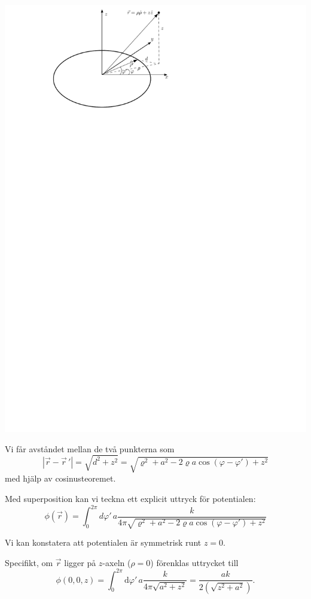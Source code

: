 \documentclass[%
oneside,                 %
final,                   %
10pt]{article}
\newenvironment{notice_mdfboxadmon}[1][]{
\begin{notice_mdfboxmdframed}[frametitle=#1]
}
{
\end{notice_mdfboxmdframed}
}
\begin{document}
\begin{notice_mdfboxadmon}
\centerline{\includegraphics[width=0.8\linewidth]{fig/ex6_cirkelkalla.pdf}}

\vspace{6mm}



Vi får avståndet mellan de två punkterna som
\begin{equation}
|\vec{r}-\vec{r}\,'|
= \sqrt{d^2 + z^2}
=\sqrt{\varrho^2+a^2-2\varrho a \cos(\varphi-\varphi')+z^2}
\end{equation}
med hjälp av cosinusteoremet.

Med superposition kan vi teckna ett explicit uttryck för potentialen:
\begin{equation}
\phi(\vec{r})=\int_0^{2\pi}d\varphi'\,
a \frac{k}{4\pi \sqrt{\varrho^2+a^2-2\varrho a \cos(\varphi-\varphi')+z^2}}
\end{equation}

Vi kan konstatera att potentialen är symmetrisk runt $z=0$.

Specifikt, om $\vec{r}$ ligger på $z$-axeln ($\rho = 0$) förenklas uttrycket till
\begin{equation}
\phi(0,0,z) = \int_0^{2\pi}\mbox{d}\varphi'\,
a \frac{k}{4\pi \sqrt{a^2+z^2}} 
=\frac{a k}{2 \left(\sqrt{z^2+a^2} \right)}.
\end{equation}


\end{notice_mdfboxadmon}
\end{document}
